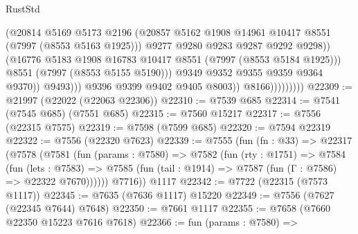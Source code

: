 \begin{lexlean}{RustStd}
\begin{coremodule}
{\begin{coremodule}
{{{{{{{{{{{{{{{{{{{{{{{{{{{{{{{{{{{{{{{{{{{                                        (@20814
                                          @5169
                                          @5173
                                          @2196
                                          (@20857
                                            @5162
                                            @1908
                                            @14961
                                            @10417
                                            @8551
                                            (@7997 (@8553 @5163 @1925)))
                                          @9277
                                          @9280
                                          @9283
                                          @9287
                                          @9292
                                          @9298))
                                      (@16776
                                        @5183
                                        @1908
                                        @16783
                                        @10417
                                        @8551
                                        (@7997 (@8553 @5184 @1925)))
                                      @8551
                                      (@7997 (@8553 @5155 @5190)))
                                    @9349
                                    @9352
                                    @9355
                                    @9359
                                    @9364
                                    @9370))
                                @9493)))
                          @9396
                          @9399
                          @9402
                          @9405
                          @8003))
                      @8166)))))))))
@22309 := @21997 (@22022 (@22063 @22306))
@22310 := @7539 @685
@22314 := @7541 (@7545 @685) (@7551 @685)
@22315 := @7560 @15217
@22317 := @7556 (@22315 @7575)
@22319 := @7598 (@7599 @685)
@22320 := @7594 @22319
@22322 := @7556 (@22320 @7623)
@22339 := @7555
    (fun (fn : @33) =>
    @22317
      (@7578
        (@7581
          (fun (params : @7580) =>
          @7582
            (fun (rty : @1751) =>
            @7584
              (fun (lets : @7583) =>
              @7585 (fun (tail : @1914) => @7587 (fun (Γ : @7586) => @22322 @7670))))))
        @7716))
    @1117
@22342 := @7722 (@22315 (@7573 @1117))
@22345 := @7635 (@7636 @1117) @15220
@22349 := @7556 (@7627 (@22345 @7644) @7648)
@22350 := @7661 @1117
@22355 := @7658 (@7660 @22350 @15223 @7616 @7618)
@22366 := fun (params : @7580) =>
}}}}}}}}}}}}}}}}}}}}}}}}}}}}}}}}}}}}}}}}}}}
\end{coremodule}}
\end{coremodule}
\end{lexlean}
